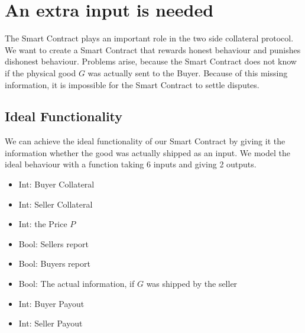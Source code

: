 \documentclass{cacthesis}
\begin{document}
\section{An extra input is needed}
The Smart Contract plays an important role in the two side collateral protocol. We want to create a Smart Contract that rewards honest behaviour and punishes dishonest behaviour.\newline 
Problems arise, because the Smart Contract does not know if the physical good $G$ was actually sent to the Buyer. Because of this missing information, it is impossible for the Smart Contract to settle disputes.
\subsection{Ideal Functionality}
We can achieve the ideal functionality of our Smart Contract by giving it the information whether the good was actually shipped as an input. We model the ideal behaviour with a function taking 6 inputs and giving 2 outputs.

\begin{itemize}
\item{Int: Buyer Collateral}
\item{Int: Seller Collateral}
\item{Int: the Price $P$}
\item{Bool: Sellers report}
\item{Bool: Buyers report}
\item{Bool: The actual information, if $G$ was shipped by the seller}
\end{itemize}

\begin{itemize}
\item{Int: Buyer Payout}
\item{Int: Seller Payout}
\end{itemize}

\end{document}
